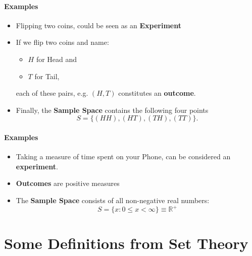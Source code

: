 \documentclass[notes=show]{beamer}\usepackage[]{graphicx}\usepackage[]{color}
\begin{document}
\begin{frame}{\secname}
\framesubtitle{Examples}
  \begin{example}
  \begin{itemize}
  \item Flipping two coins, could be seen as an \textbf{Experiment}

  \pause

  \item If we flip two coins and name:
  \begin{itemize}
  \item $H$ for Head and
  \item $T$ for Tail,
  \end{itemize}
  each of these pairs, e.g. $(H,T)$ constitutes an \textbf{outcome}.

  \pause

  \item Finally, the \textbf{Sample Space} contains the following four points
  $$ S = \{ (HH),(HT),(TH),(TT)  \}.$$
  \end{itemize}
  \end{example}
\end{frame}

\begin{frame}{\secname}
\framesubtitle{Examples}
  \begin{example}
  \begin{itemize}
  \item Taking a measure of time spent on your Phone, can be considered an \textbf{experiment}.

  \item \textbf{Outcomes} are positive measures


  \item The \textbf{Sample Space} consists of all non-negative real numbers:
  $$
  S = \{x: 0 \leq x < \infty \} \equiv \mathbb{R}^+
  $$
  \end{itemize}
  \end{example}
\end{frame}

\section{Some Definitions from Set Theory}
\end{document}
